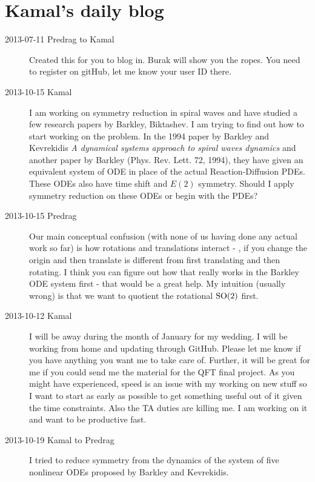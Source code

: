 
\chapter{Kamal's daily blog}
\label{c-dailyBlogKS}

\begin{description}
\item[2013-07-11  Predrag to Kamal] Created this for you to blog
in. Burak will show you the ropes. You need to register on gitHub, let me
know your user ID there.

\item[2013-10-15  Kamal] I am working on symmetry reduction in spiral waves and have studied a few research papers by Barkley, Biktashev. I am trying to find out how to start working on the problem. In the 1994 paper by Barkley and Kevrekidis {\em A dynamical systems approach to spiral waves dynamics} and another paper by Barkley (Phys. Rev. Lett. 72, 1994), they have given an equivalent system of ODE in place of the actual Reaction-Diffusion PDEs. These ODEs also have time shift and $E(2)$ symmetry. Should I apply symmetry reduction on these ODEs or begin with the PDEs?

\item[2013-10-15 Predrag] Our main conceptual confusion (with none of us having
done any actual work so far) is how rotations and translations interact - \ie, if you change the origin and then translate is different from first translating and then rotating. I think you can figure out how that really works in the Barkley ODE system first - that would be a great help. My intuition (usually wrong) is that we want to
quotient the rotational $\textrm{SO}(2)$ first.

\item[2013-10-12  Kamal] I will be away during the month of January for my wedding.
I will be working from home and updating through GitHub.
Please let me know if you have anything you want me to take care of.
Further, it will be great for me if you could send me the material
for the QFT final project. As you might have experienced, speed is
an issue with my working on new stuff so I want to start as early
as possible to get something useful out of it given the time constraints.
Also the TA duties are killing me. I am working on it and want to be productive fast.


\item[2013-10-19 Kamal to Predrag] I tried to reduce  symmetry
from the dynamics of the system of five nonlinear ODEs proposed by
Barkley and Kevrekidis.



\end{description}
